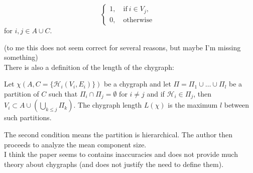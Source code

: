 \begin{itemize}
\begin{definition}
\begin{equation*}
\begin{cases}
            1, \quad \text{if} \ i \in V_j ,& \\
            0, \quad \text{otherwise}
        \end{cases}
    \end{equation*}
    for $i,j \in A \cup C$.
    \end{definition}
    (to me this does not seem correct for several reasons, but maybe I'm missing something) \\
    There is also a definition of the length of the chygraph:
    \begin{definition}
        Let $\chi(A, C=\{ \mathcal{H}_i(V_i, E_i)\})$ be a chygraph and let $\Pi = \Pi_1 \cup \dots \cup \Pi_l$ be a partition of $C$ such that $\Pi_i \cap \Pi_j = \emptyset \text{ for } i \neq j$ and if $\mathcal{H}_i \in \Pi_j$, then $V_i \subset A \cup (\bigcup_{k \leq j} \Pi_k)$. The chygraph length $L(\chi)$ is the maximum $l$ between such partitions. 
        \end{definition}
    The second condition means the partition is hierarchical. The author then proceeds to analyze the mean component size. \\ 
    I think the paper seems to contains inaccuracies and does not provide much theory about chygraphs (and does not justify the need to define them). 



\end{itemize}